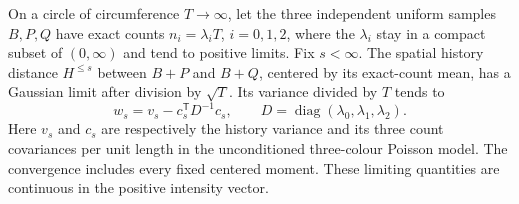 \documentclass[11pt,letterpaper]{article}
\begin{document}
\begin{lemma}
\label{lem:dense-cutoff-conditional-CLT}
On a circle of circumference $T\to\infty$, let the three
independent uniform samples $B,P,Q$ have exact counts
$n_i=\lambda_iT$, $i=0,1,2$, where the $\lambda_i$ stay in a
compact subset of $(0,\infty)$ and tend to positive limits.
Fix $s<\infty$. The spatial history distance $H^{\le s}$
between $B+P$ and $B+Q$, centered by its exact-count mean,
has a Gaussian limit after division by $\sqrt T$.
Its variance divided by $T$ tends to
\begin{equation}\label{eq:dense-cutoff-variance}
 w_s=v_s-c_s^{\mathsf T}D^{-1}c_s,\qquad
 D=\operatorname{diag}(\lambda_0,\lambda_1,\lambda_2).
\end{equation}
Here $v_s$ and $c_s$ are respectively the history variance
and its three count covariances per unit length in the
unconditioned three-colour Poisson model.
The convergence includes every fixed centered moment.
These limiting quantities are continuous in the positive
intensity vector.
\end{lemma}
\end{document}
